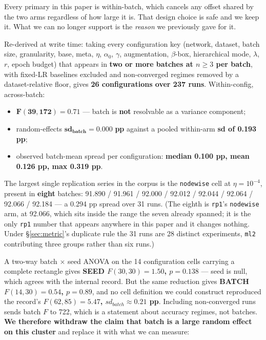 \documentclass[10pt,letterpaper]{article}
\newcommand{\arm}[1]{\texttt{#1}}
\begin{document}
Every primary in this paper is within-batch, which cancels any offset shared by the two arms
regardless of how large it is. That design choice is safe and we keep it. What we can no longer
support is the \emph{reason} we previously gave for it.

Re-derived at write time: taking every configuration key (network, dataset, batch size,
granularity, base, meta, $\eta$, $\alpha_0$, $\gamma$, augmentation, $\beta$-box, hierarchical
mode, $\lambda$, $r$, epoch budget) that appears in \textbf{two or more batches at $n \ge 3$ per
batch}, with fixed-LR baselines excluded and non-converged regimes removed by a dataset-relative
floor, gives \textbf{26 configurations over 237 runs}. Within-config, across-batch:

\begin{itemize}
\item $\mathbf{F(39, 172) = 0.71}$ --- batch is \textbf{not} resolvable as a variance component;
\item random-effects $\mathbf{sd_{batch} = 0.000}$ \textbf{pp} against a pooled within-arm
  \textbf{sd of 0.193 pp};
\item observed batch-mean spread per configuration: \textbf{median 0.100 pp, mean 0.126 pp, max
  0.319 pp}.
\end{itemize}

The largest single replication series in the corpus is the \arm{nodewise} cell at
$\eta = 10^{-4}$, present in \textbf{eight} batches: 91.890 / 91.961 / 92.000 / 92.012 / 92.044 /
92.064 / 92.066 / 92.184 --- a 0.294 pp spread over 31 runs. (The eighth is \arm{rp1}'s
\arm{nodewise} arm, at 92.066, which sits inside the range the seven already spanned; it is the
only \arm{rp1} number that appears anywhere in this paper and it changes nothing. Under
\S\ref{sec:metric}'s duplicate rule the 31 runs are 28 distinct experiments, \arm{ml2}
contributing three groups rather than six runs.)

A two-way batch $\times$ seed ANOVA on the 14 configuration cells carrying a complete rectangle
gives \textbf{SEED $F(30, 30) = 1.50$, $p = 0.138$} --- seed is null, which agrees with the
internal record. But the same reduction gives \textbf{BATCH $F(14, 30) = 0.54$, $p = 0.89$}, and no
cell definition we could construct reproduced the record's \textbf{$F(62, 85) = 5.47$,
$sd_{batch} \approx 0.21$ pp}. Including non-converged runs sends batch $F$ to 722, which is a
statement about accuracy regimes, not batches. \textbf{We therefore withdraw the claim that batch
is a large random effect on this cluster} and replace it with what we can measure:
\end{document}
